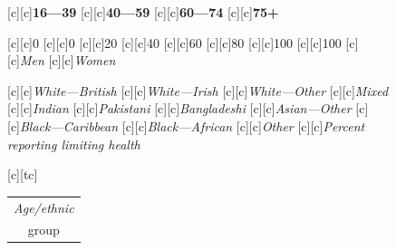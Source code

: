 \documentclass[11 pt, a4paper]{report}
\begin{document}
\begin{figure}[hbtp!]
[c][c]{\small{\textbf{16---39}}}
[c][c]{\small{\textbf{40---59}}}
[c][c]{\small{\textbf{60---74}}}
[c][c]{\small{\textbf{75+}}}

[c][c]{\small{0}}
[c][c]{\small{0}}
[c][c]{\small{20}}
[c][c]{\small{40}}
[c][c]{\small{60}}
[c][c]{\small{80}}
[c][c]{\small{100}}
[c][c]{\small{100}}
[c][c]{\small{\emph{Men}}}
[c][c]{\small{\emph{Women}}}

[c][c]{\scriptsize{\emph{White---British}}}
[c][c]{\scriptsize{\emph{White---Irish}}}
[c][c]{\scriptsize{\emph{White---Other}}}
[c][c]{\scriptsize{\emph{Mixed}}}
[c][c]{\scriptsize{\emph{Indian}}}
[c][c]{\scriptsize{\emph{Pakistani}}}
[c][c]{\scriptsize{\emph{Bangladeshi}}}
[c][c]{\scriptsize{\emph{Asian---Other}}}
[c][c]{\scriptsize{\emph{Black---Caribbean}}}
[c][c]{\scriptsize{\emph{Black---African}}}
[c][c]{\scriptsize{\emph{Other}}}
[c][c]{\scriptsize{\emph{Percent reporting limiting health}}}

[c][tc]{\scriptsize{
\begin{tabular}{c}
\emph{Age/ethnic}\\
group
\end{tabular}
}}


\end{figure}
\end{document}
